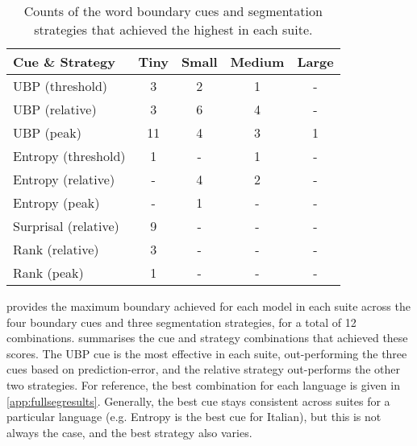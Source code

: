 \begin{table}[t]
    \centering
    \small
    \begin{tabular}{lcccc}
    \toprule
    Cue \& Strategy & Tiny & Small & Medium & Large \\
    \midrule
    UBP (threshold) & 3 & 2 & 1 & - \\
    UBP (relative) & 3 & 6 & 4 & - \\
    UBP (peak) & 11 & 4 & 3 & 1 \\
    Entropy (threshold) & 1 & - & 1 & - \\
    Entropy (relative) & - & 4 & 2 & - \\
    Entropy (peak) & - & 1 & - & - \\
    Surprisal (relative) & 9 & - & - & - \\
    Rank (relative) & 3 & - & - & - \\
    Rank (peak) & 1 & - & - & - \\
    \bottomrule
    \end{tabular}
\caption{Counts of the word boundary cues and segmentation strategies that achieved the highest \fscores in each suite.}
\label{tab:15-bestcues}
\end{table}

 provides the maximum boundary \fscore achieved for each model in each suite across the four boundary cues and three segmentation strategies, for a total of 12 combinations.  summarises the cue and strategy combinations that achieved these scores. The UBP cue is the most effective in each suite, out-performing the three cues based on prediction-error, and the relative strategy out-performs the other two strategies. For reference, the best combination for each language is given in \cref{app:fullsegresults}. Generally, the best cue stays consistent across suites for a particular language (e.g. Entropy is the best cue for Italian), but this is not always the case, and the best strategy also varies. %


